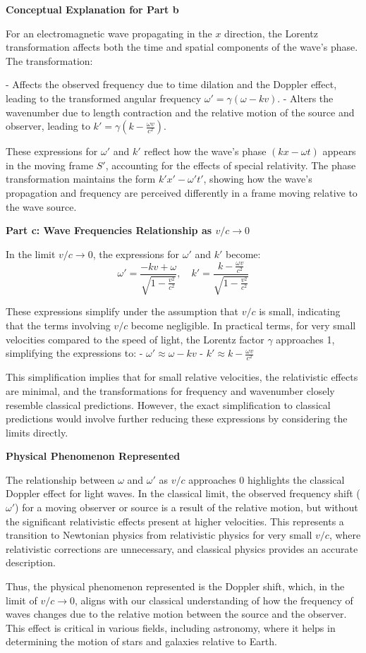 \documentclass[a4paper,11pt]{article}
\begin{document}
\textbf{Conceptual Explanation for Part b}

For an electromagnetic wave propagating in the \( x \) direction, the Lorentz transformation affects both the time and spatial components of the wave's phase. The transformation:

- Affects the observed frequency due to time dilation and the Doppler effect, leading to the transformed angular frequency \( \omega' = \gamma(\omega - kv) \).
- Alters the wavenumber due to length contraction and the relative motion of the source and observer, leading to \( k' = \gamma(k - \frac{\omega v}{c^2}) \).

These expressions for \( \omega' \) and \( k' \) reflect how the wave's phase \( (kx - \omega t) \) appears in the moving frame \( S' \), accounting for the effects of special relativity. The phase transformation maintains the form \( k'x' - \omega' t' \), showing how the wave's propagation and frequency are perceived differently in a frame moving relative to the wave source.

\textbf{Part c: Wave Frequencies Relationship as \( v/c \rightarrow 0 \)}

In the limit \( v/c \rightarrow 0 \), the expressions for \( \omega' \) and \( k' \) become:
\[
\omega' = \frac{-kv + \omega}{\sqrt{1 - \frac{v^2}{c^2}}}, \quad k' = \frac{k - \frac{\omega v}{c^2}}{\sqrt{1 - \frac{v^2}{c^2}}}
\]

These expressions simplify under the assumption that \( v/c \) is small, indicating that the terms involving \( v/c \) become negligible. In practical terms, for very small velocities compared to the speed of light, the Lorentz factor \( \gamma \) approaches 1, simplifying the expressions to:
- \( \omega' \approx \omega - kv \)
- \( k' \approx k - \frac{\omega v}{c^2} \)

This simplification implies that for small relative velocities, the relativistic effects are minimal, and the transformations for frequency and wavenumber closely resemble classical predictions. However, the exact simplification to classical predictions would involve further reducing these expressions by considering the limits directly.

\textbf{Physical Phenomenon Represented}

The relationship between \( \omega \) and \( \omega' \) as \( v/c \) approaches 0 highlights the classical Doppler effect for light waves. In the classical limit, the observed frequency shift (\( \omega' \)) for a moving observer or source is a result of the relative motion, but without the significant relativistic effects present at higher velocities. This represents a transition to Newtonian physics from relativistic physics for very small \( v/c \), where relativistic corrections are unnecessary, and classical physics provides an accurate description.

Thus, the physical phenomenon represented is the Doppler shift, which, in the limit of \( v/c \rightarrow 0 \), aligns with our classical understanding of how the frequency of waves changes due to the relative motion between the source and the observer. This effect is critical in various fields, including astronomy, where it helps in determining the motion of stars and galaxies relative to Earth.
\end{document}
